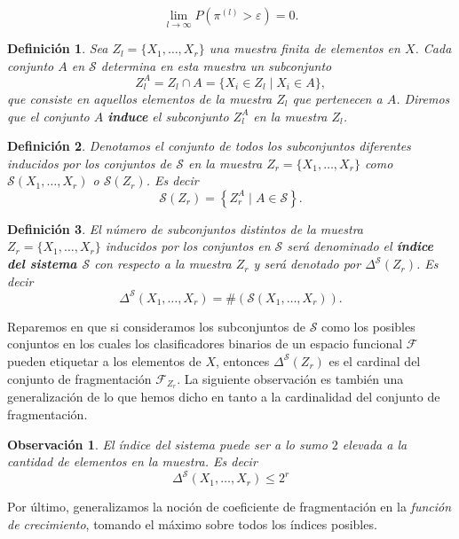 \documentclass{report}
\newtheorem{dfn}{Definición}[subsection]
\newtheorem{obs}{Observación}[subsection]
\begin{document}
\[
\lim_{l \to \infty} P\left(\pi^{(l)} > \varepsilon\right) = 0.
\]
\bigskip


\begin{dfn}
Sea \( Z_l = \{X_1, \dots, X_r\} \) una muestra finita de elementos en \( X \). 
Cada conjunto \( A \) en \( \mathcal{S} \) determina en esta muestra un subconjunto 
\[ 
    Z_l^A = Z_l \cap A = \{X_i \in Z_l \mid X_i \in A\}, 
\]
que consiste en aquellos elementos de la 
muestra \( Z_l \) que pertenecen a \( A \). Diremos que el conjunto \( A \) \textbf{induce} 
el subconjunto \( Z_l^A  \) en la muestra \( Z_l \).
\end{dfn}
\bigskip

\begin{dfn}
Denotamos el conjunto de todos los subconjuntos diferentes inducidos por los 
conjuntos de \( \mathcal{S} \) en la muestra \( Z_r = \{X_1, \dots, X_r\} \) como \( \mathcal{S}(X_1, \dots, X_r) \) 
o \( \mathcal{S}(Z_r) \). Es decir
\[
    \mathcal{S}(Z_r) =  \left\{Z_r^A \mid A \in \mathcal{S}\right\}.
\]
\end{dfn}
\bigskip

\begin{dfn}
El número de subconjuntos distintos de la muestra \( Z_r = \{X_1, \dots, X_r\} \) 
inducidos por los conjuntos en \( \mathcal{S} \) será denominado el \textbf{índice 
del sistema \( \mathcal{S} \)} con respecto a la muestra \( Z_r \) 
y será denotado por $\Delta^{\mathcal{S}}(Z_r)$. Es decir
\[
\Delta^{\mathcal{S}}(X_1, \dots, X_r) = \#\left(\mathcal{S}(X_1, \dots, X_r)\right).
\]
\end{dfn}

Reparemos en que si consideramos los subconjuntos de $\mathcal{S}$ como los posibles conjuntos en
los cuales los clasificadores binarios de un espacio funcional $\mathcal{F}$ pueden etiquetar a los
elementos de $X$, entonces $\Delta^{\mathcal{S}}(Z_r)$ es el cardinal del conjunto de fragmentación $\mathcal{F}_{Z_r}$.
La siguiente observación es también una generalización
de lo que hemos dicho en tanto a la cardinalidad del conjunto de fragmentación.\newline


\begin{obs} El índice del sistema puede ser a lo sumo $2$ elevada a la cantidad de elementos en la muestra. Es decir
\[
    \Delta^{\mathcal{S}}(X_1, \dots, X_r) \leq 2^r
\]
\end{obs}

Por último, generalizamos la noción de coeficiente de fragmentación en la \textit{función de crecimiento},
tomando el máximo sobre todos los índices posibles.\newline
\end{document}
